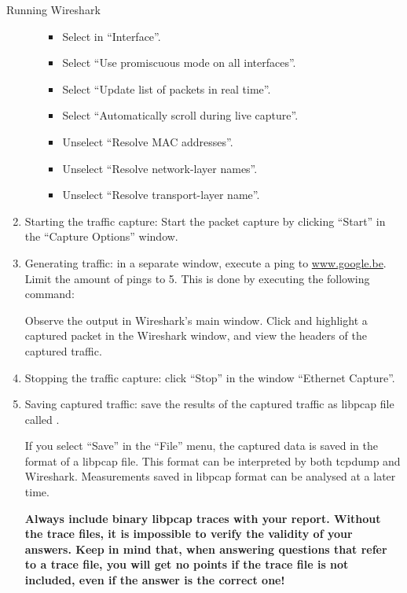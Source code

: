 \begin{exercise}{Running Wireshark}
\begin{enumerate}
\begin{minipage}{\linewidth}
\begin{framed}
\begin{enumerate}
						\begin{itemize}
							\item Select  in ``Interface''.
							\item Select ``Use promiscuous mode on all interfaces''.
							\item Select ``Update list of packets in real time''.
							\item Select ``Automatically scroll during live capture''.
							\item Unselect ``Resolve MAC addresses''.
							\item Unselect ``Resolve network-layer names''.
							\item Unselect ``Resolve transport-layer name''.
						\end{itemize}
				\end{enumerate}
			\end{framed}
			\label{fig:lab1-capture-options}
		\end{minipage}

	\item Starting the traffic capture: Start the packet capture by clicking ``Start'' in the ``Capture Options'' window.

	\item Generating traffic: in a separate window, execute a ping to \url{www.google.be}. Limit the amount of pings to 5. This is done by executing the following command:
	\begin{cmdblock}[gobble=2]
	\end{cmdblock}
	
	Observe the output in Wireshark's main window. Click and highlight a captured packet in the Wireshark window, and view the headers of the captured traffic.

	\item Stopping the traffic capture: click ``Stop'' in the window ``Ethernet Capture''.
	\item Saving captured traffic: save the results of the captured traffic as libpcap file called . 
			
			\remark If you select ``Save'' in the ``File'' menu, the captured data is saved in the format of a libpcap file. This format can be interpreted by both tcpdump and Wireshark. Measurements saved in libpcap format can be analysed at a later time.
			
			\remark \textbf{Always include binary libpcap traces with your report. Without the trace files, it is impossible to verify the validity of your answers. Keep in mind that, when answering questions that refer to a trace file, you will get no points if the trace file is not included, even if the answer is the correct one!}
\end{enumerate}


\end{exercise}
